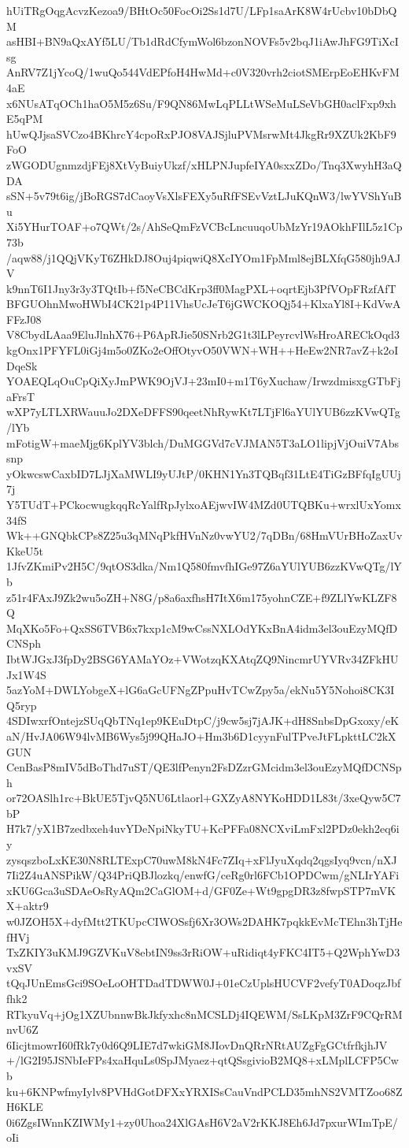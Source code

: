 hUiTRgOqgAcvzKezoa9/BHtOc50FocOi2Ss1d7U/LFp1saArK8W4rUcbv10bDbQM
asHBI+BN9aQxAYf5LU/Tb1dRdCfymWol6bzonNOVFs5v2bqJ1iAwJhFG9TiXcIsg
AnRV7Z1jYcoQ/1wuQo544VdEPfoH4HwMd+c0V320vrh2ciotSMErpEoEHKvFM4aE
x6NUsATqOCh1haO5M5z6Su/F9QN86MwLqPLLtWSeMuLSeVbGH0aclFxp9xhE5qPM
hUwQJjsaSVCzo4BKhrcY4cpoRxPJO8VAJSjluPVMsrwMt4JkgRr9XZUk2KbF9FoO
zWGODUgnmzdjFEj8XtVyBuiyUkzf/xHLPNJupfeIYA0sxxZDo/Tnq3XwyhH3aQDA
sSN+5v79t6ig/jBoRGS7dCaoyVsXlsFEXy5uRfFSEvVztLJuKQnW3/lwYVShYuBu
Xi5YHurTOAF+o7QWt/2s/AhSeQmFzVCBcLncuuqoUbMzYr19AOkhFIlL5z1Cp73b
/aqw88/j1QQjVKyT6ZHkDJ8Ouj4piqwiQ8XcIYOm1FpMml8ejBLXfqG580jh9AJV
k9nnT6I1Jny3r3y3TQtIb+f5NeCBCdKrp3ff0MagPXL+oqrtEjb3PfVOpFRzfAfT
BFGUOhnMwoHWbI4CK21p4P11VhsUcJeT6jGWCKOQj54+KlxaYl8I+KdVwAFFzJ08
V8CbydLAaa9EluJlnhX76+P6ApRJie50SNrb2G1t3lLPeyrcvlWsHroARECkOqd3
kgOnx1PFYFL0iGj4m5o0ZKo2eOffOtyvO50VWN+WH++HeEw2NR7avZ+k2oIDqeSk
YOAEQLqOuCpQiXyJmPWK9OjVJ+23mI0+m1T6yXuchaw/IrwzdmisxgGTbFjaFrsT
wXP7yLTLXRWauuJo2DXeDFFS90qeetNhRywKt7LTjFl6aYUlYUB6zzKVwQTg/lYb
mFotigW+maeMjg6KplYV3blch/DuMGGVd7cVJMAN5T3aLO1lipjVjOuiV7Abssnp
yOkwcswCaxbID7LJjXaMWLI9yUJtP/0KHN1Yn3TQBqf31LtE4TiGzBFfqIgUUj7j
Y5TUdT+PCkocwugkqqRcYalfRpJylxoAEjwvIW4MZd0UTQBKu+wrxlUxYomx34fS
Wk++GNQbkCPs8Z25u3qMNqPkfHVnNz0vwYU2/7qDBn/68HmVUrBHoZaxUvKkeU5t
1JfvZKmiPv2H5C/9qtOS3dka/Nm1Q580fmvfhIGe97Z6aYUlYUB6zzKVwQTg/lYb
z51r4FAxJ9Zk2wu5oZH+N8G/p8a6axfhsH7ItX6m175yohnCZE+f9ZLlYwKLZF8Q
MqXKo5Fo+QxSS6TVB6x7kxp1cM9wCssNXLOdYKxBnA4idm3el3ouEzyMQfDCNSph
IbtWJGxJ3fpDy2BSG6YAMaYOz+VWotzqKXAtqZQ9NincmrUYVRv34ZFkHUJx1W4S
5azYoM+DWLYobgeX+lG6aGcUFNgZPpuHvTCwZpy5a/ekNu5Y5Nohoi8CK3IQ5ryp
4SDIwxrfOntejzSUqQbTNq1ep9KEuDtpC/j9cw5sj7jAJK+dH8SnbsDpGxoxy/eK
aN/HvJA06W94lvMB6Wys5j99QHaJO+Hm3b6D1cyynFulTPveJtFLpkttLC2kXGUN
CenBasP8mIV5dBoThd7uST/QE3lfPenyn2FsDZzrGMcidm3el3ouEzyMQfDCNSph
or72OASlh1rc+BkUE5TjvQ5NU6Ltlaorl+GXZyA8NYKoHDD1L83t/3xeQyw5C7bP
H7k7/yX1B7zedbxeh4uvYDeNpiNkyTU+KcPFFa08NCXviLmFxl2PDz0ekh2eq6iy
zysqszboLxKE30N8RLTExpC70uwM8kN4Fc7ZIq+xFlJyuXqdq2qgsIyq9vcn/nXJ
7Ii2Z4uANSPikW/Q34PriQBJlozkq/enwfG/ceRg0rl6FCb1OPDCwm/gNLIrYAFi
xKU6Gca3uSDAeOsRyAQm2CaGlOM+d/GF0Ze+Wt9gpgDR3z8fwpSTP7mVKX+aktr9
w0JZOH5X+dyfMtt2TKUpcCIWOSsfj6Xr3OWs2DAHK7pqkkEvMcTEhn3hTjHefHVj
TxZKIY3uKMJ9GZVKuV8ebtIN9ss3rRiOW+uRidiqt4yFKC4IT5+Q2WphYwD3vxSV
tQqJUnEmsGci9SOeLoOHTDadTDWW0J+01eCzUplsHUCVF2vefyT0ADoqzJbffhk2
RTkyuVq+jOg1XZUbnnwBkJkfyxhc8nMCSLDj4IQEWM/SsLKpM3ZrF9CQrRMnvU6Z
6IicjtmowrI60fRk7y0d6Q9LIE7d7wkiGM8JIovDnQRrNRtAUZgFgGCtfrfkjhJV
+/lG2I95JSNbIeFPs4xaHquLs0SpJMyaez+qtQSsgivioB2MQ8+xLMplLCFP5Cwb
ku+6KNPwfmyIylv8PVHdGotDFXxYRXISsCauVndPCLD35mhNS2VMTZoo68ZH6KLE
0i6ZgsIWnnKZIWMy1+zy0Uhoa24XlGAsH6V2aV2rKKJ8Eh6Jd7pxurWImTpE/oIi
